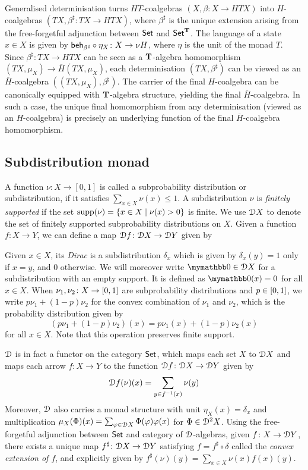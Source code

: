 Generalised determinisation turns $HT$-coalgebras $(X, \beta \colon X \to HT X)$ into $H$-coalgebras $(T X , \beta^\sharp \colon T X \to H T X)$, where $\beta^\sharp$ is the unique extension arising from the free-forgetful adjunction between ${\mathsf{Set}}$ and ${\mathsf{Set}}^{\mathbf{T}}$. The language of a state $x \in X$ is given by $\mathsf{beh}_{\beta^\sharp} \circ \eta_X \colon X \to \nu H$, where $\eta$ is the unit of the monad $T$. Since $\beta^\sharp \colon TX \to HTX$ can be seen as a $\mathbf{T}$-algebra homomorphism $(TX, \mu_X) \to \overline{H}(TX, \mu_X)$, each determinisation $(TX, \beta^{\sharp})$ can be viewed as an $\overline{H}$-coalgebra $((TX, \mu_X), \beta^{\sharp})$. The carrier of the final $H$-coalgebra can be canonically equipped with $\mathbf{T}$-algebra structure, yielding the final $\overline{H}$-coalgebra. In such a case, the unique final homomorphism from any determinisation (viewed as an $H$-coalgebra) is precisely an underlying function of the final $\overline{H}$-coalgebra homomorphism. 

\subsection{Subdistribution monad}\label{c4:subsec:subdistribution}
 A function $\nu \colon X \to [0,1]$ is called a subprobability distribution or subdistribution, if it satisfies $\sum_{x \in X} \nu(x) \leq 1$. A subdistribution $\nu$ is \emph{finitely supported}  if the set $\operatorname{supp}(\nu) = \{x \in X \mid \nu(x) > 0\}$ is finite. We use $\mathcal{D} {X}$ to denote the set of finitely supported subprobability distributions on $X$. Given a function $f \colon X \to Y$, we can define a map $\mathcal{D} f \colon \mathcal{D} X \to \mathcal{D} Y$ given by 
 
 Given $x \in X$, its \emph{Dirac} is a subdistribution $\delta_x$ which is given by $\delta_x(y)=1$ only if $x=y$, and $0$ otherwise. We will moreover write $\emptydist \in \distf X$ for a subdistribution with an empty support. It is defined as $\emptydist(x)=0$ for all $x \in X$. When $\nu_1, \nu_2 \colon X \to \interval{0}{1}$ are subprobability distributions and $p \in \interval{0}{1}$, we write $p\nu_1 + (1-p)\nu_2$ for the convex combination of $\nu_1$ and $\nu_2$, which is the probability distribution given by $$(p \nu_1 + (1-p) \nu_2)(x) = p\nu_1(x) + (1-p)\nu_2(x)$$
 for all $x \in X$. Note that this operation preserves finite support. 
 
  $\mathcal{D}$ is in fact a functor on the category ${\mathsf{Set}}$, which maps each set $X$ to $\mathcal{D} X$ and maps each arrow $f \colon X \to Y$ to the function $\mathcal{D} f \colon \mathcal{D} X \to \mathcal{D} Y$ given by $$\mathcal{D} f (\nu)(x) = \sum_{y \in f^{-1}(x)} \nu(y)$$
   Moreover, $\mathcal{D}$ also  carries a monad structure with unit  $\eta_X(x) = \delta_x$ and multiplication $\mu_X(\Phi)(x) = \sum_{\varphi \in \mathcal{D} X }\Phi(\varphi)\varphi(x)$ for $\Phi \in \mathcal{D}^2 X$. Using the free-forgetful adjunction between ${\mathsf{Set}}$ and category of $\mathcal{D}$-algebras, given $f \colon X \to \mathcal{D} Y$, there exists a unique map $f^\sharp \colon \mathcal{D} X \to \mathcal{D} Y$ satisfying $f = f^\sharp \circ \delta$ called the \emph{convex extension of $f$}, and explicitly given by $f^\sharp(\nu)(y) = \sum_{x \in X} \nu(x) f(x)(y)$.
